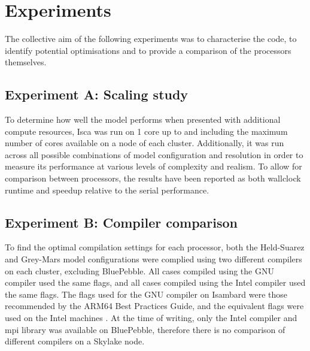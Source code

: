 \documentclass[a4paper,11pt]{report}
\begin{document}
\section{Experiments}
\label{sec:experiment-methods}
The collective aim of the following experiments was to characterise the code, to identify potential optimisations and to provide a comparison of the processors themselves.

\subsection{Experiment A: Scaling study}
To determine how well the model performs when presented with additional compute resources, Isca was run on 1 core up to and including the maximum number of cores available on a node of each cluster. Additionally, it was run across all possible combinations of model configuration and resolution in order to measure its performance at various levels of complexity and realism. To allow for comparison between processors, the results have been reported as both wallclock runtime and speedup relative to the serial performance.
\par

\subsection{Experiment B: Compiler comparison}
To find the optimal compilation settings for each processor, both the Held-Suarez and Grey-Mars model configurations were complied using two different compilers on each cluster, excluding BluePebble. All cases compiled using the GNU compiler used the same flags, and all cases compiled using the Intel compiler used the same flags. The flags used for the GNU compiler on Isambard were those recommended by the ARM64 Best Practices Guide, and the equivalent flags were used on the Intel machines \cite{arm2019practices}. At the time of writing, only the Intel compiler and \gls{mpi} library was available on BluePebble, therefore there is no comparison of different compilers on a Skylake node. 
\par
\end{document}
